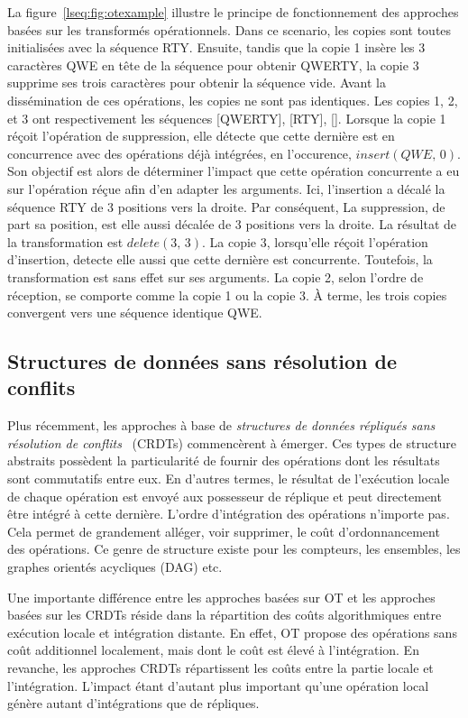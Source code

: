 La figure~\ref{lseq:fig:otexample} illustre le principe de fonctionnement des
approches basées sur les transformés opérationnels. Dans ce scenario, les copies
sont toutes initialisées avec la séquence RTY. Ensuite, tandis que la copie 1
insère les 3 caractères QWE en tête de la séquence pour obtenir QWERTY, la copie
3 supprime ses trois caractères pour obtenir la séquence vide. Avant la
dissémination de ces opérations, les copies ne sont pas identiques. Les copies
1, 2, et 3 ont respectivement les séquences [QWERTY], [RTY], []. Lorsque la
copie 1 réçoit l'opération de suppression, elle détecte que cette dernière est
en concurrence avec des opérations déjà intégrées, en l'occurence,
$insert(QWE,\,0)$. Son objectif est alors de déterminer l'impact que cette
opération concurrente a eu sur l'opération réçue afin d'en adapter les
arguments. Ici, l'insertion a décalé la séquence RTY de 3 positions vers la
droite. Par conséquent, La suppression, de part sa position, est elle aussi
décalée de 3 positions vers la droite. La résultat de la transformation est
$delete(3,\,3)$.  La copie 3, lorsqu'elle réçoit l'opération d'insertion,
detecte elle aussi que cette dernière est concurrente. Toutefois, la
transformation est sans effet sur ses arguments. La copie 2, selon l'ordre de
réception, se comporte comme la copie 1 ou la copie 3. À terme, les trois copies
convergent vers une séquence identique QWE.

\subsection{Structures de données sans résolution de conflits}

Plus récemment, les approches à base de \emph{structures de données répliqués
  sans résolution de conflits}~\cite{shapiro2011comprehensive,
  shapiro2011conflict} (CRDTs) commencèrent à émerger. Ces types de structure
abstraits possèdent la particularité de fournir des opérations dont les
résultats sont commutatifs entre eux.  En d'autres termes, le résultat de
l'exécution locale de chaque opération est envoyé aux possesseur de réplique et
peut directement être intégré à cette dernière.  L'ordre d'intégration des
opérations n'importe pas. Cela permet de grandement alléger, voir supprimer, le
coût d'ordonnancement des opérations. Ce genre de structure existe pour les
compteurs, les ensembles, les graphes orientés acycliques (DAG) etc.

Une importante différence entre les approches basées sur OT et les approches
basées sur les CRDTs réside dans la répartition des coûts algorithmiques entre
exécution locale et intégration distante. En effet, OT propose des opérations
sans coût additionnel localement, mais dont le coût est élevé à l'intégration.
En revanche, les approches CRDTs répartissent les coûts entre la partie locale
et l'intégration.  L'impact étant d'autant plus important qu'une opération local
génère autant d'intégrations que de répliques.

